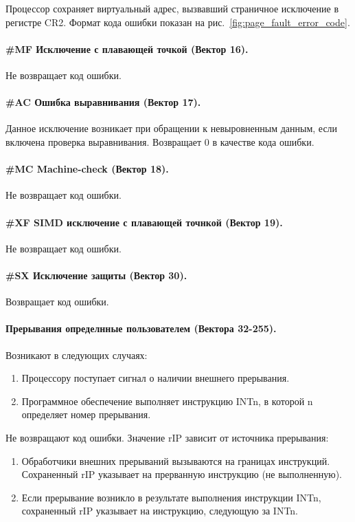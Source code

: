 Процессор сохраняет виртуальный адрес, вызвавший страничное
исключение в регистре CR2. Формат кода ошибки показан на
рис.~\ref{fig:page_fault_error_code}.

\paragraph{\#MF Исключение с плавающей точкой (Вектор 16).}
Не возвращает код ошибки.

\paragraph{\#AC Ошибка выравнивания (Вектор 17).}
Данное исключение возникает при обращении к невыровненным данным, если
включена проверка выравнивания. Возвращает 0 в качестве кода ошибки.

\paragraph{\#MC Machine-check (Вектор 18).}
Не возвращает код ошибки.

\paragraph{\#XF SIMD исключение с плавающей точнкой (Вектор 19).}
Не возвращает код ошибки.

\paragraph{\#SX Исключение защиты (Вектор 30).}
Возвращает код ошибки.

\paragraph{Прерывания определнные пользователем (Вектора 32-255).}
Возникают в следующих случаях:
\begin{enumerate}[1.]
\item Процессору поступает сигнал о наличии внешнего прерывания.
\item Программное обеспечение выполняет инструкцию INTn, в которой n
определяет номер прерывания.
\end{enumerate}

Не возвращают код ошибки. Значение rIP зависит от источника прерывания:
\begin{enumerate}[1.]
\item Обработчики внешних прерываний вызываются на границах инструкций. Сохраненный rIP
	указывает на прерванную инструкцию (не выполненную).
\item Если прерывание возникло в результате выполнения инструкции INTn,
сохраненный rIP указывает на инструкцию, следующую за INTn.
\end{enumerate}

